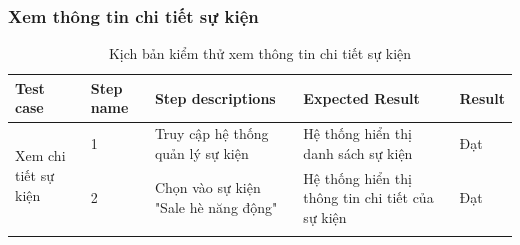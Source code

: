 \subsubsection{Xem thông tin chi tiết sự kiện}
{
    \setlength\extrarowheight{6pt}
    \begin{longtable}{| p{2.5cm}| p{1cm}| p{5.5cm}| p{4.5cm} | p{1.5cm} |}
        \hline
        \textbf{Test case}                           & \textbf{Step name} & \textbf{Step descriptions}           & \textbf{Expected Result}                         & \textbf{Result} \\
        \hline
        \multirow[c]{2}{2.5cm}{Xem chi tiết sự kiện} & 1                  & Truy cập hệ thống quản lý sự kiện    & Hệ thống hiển thị danh sách sự kiện              & Đạt             \\
        \cline{2-5}
                                                     & 2                  & Chọn vào sự kiện "Sale hè năng động" & Hệ thống hiển thị thông tin chi tiết của sự kiện & Đạt             \\
        \hline
        \caption{Kịch bản kiểm thử xem thông tin chi tiết sự kiện}
    \end{longtable}
}

\newpage

